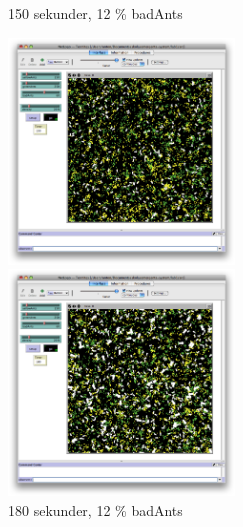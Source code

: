 \documentclass[titlepage, a4paper, 12pt]{article}
\begin{document}
\begin{figure}
  \begin{minipage}[b]{0.5\linewidth} %
    \centering
    \caption{150 sekunder, 12 \% badAnts}
    \includegraphics[width=6cm]{images/60-bad-150.png}
  \end{minipage}
  \hspace{0.5cm} %
  \begin{minipage}[b]{0.5\linewidth}
    \centering
    \caption{180 sekunder, 12 \% badAnts}\label{fig:12proc}
    \includegraphics[width=6cm]{images/60-bad-180.png}
  \end{minipage}
\end{figure}
\end{document}

